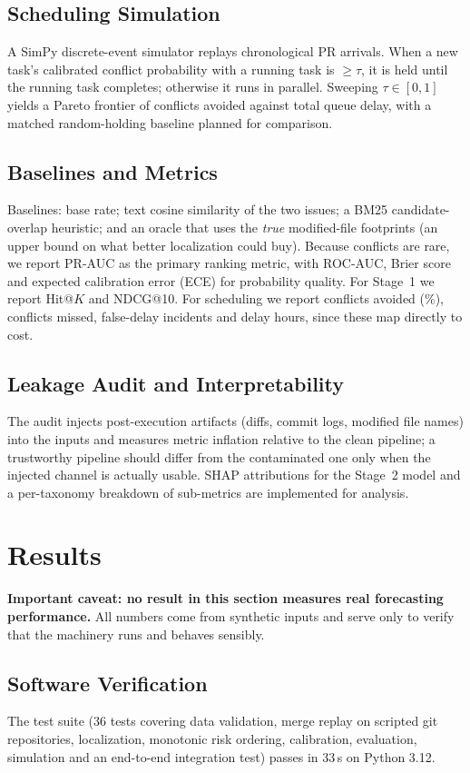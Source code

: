 \documentclass[sigconf, authorversion, nonacm]{acmart}
\begin{document}
\subsection{Scheduling Simulation}
A SimPy discrete-event simulator replays chronological PR arrivals. When a new task's calibrated conflict probability with a running task is $\ge\tau$, it is held until the running task completes; otherwise it runs in parallel. Sweeping $\tau\in[0,1]$ yields a Pareto frontier of conflicts avoided against total queue delay, with a matched random-holding baseline planned for comparison.

\subsection{Baselines and Metrics}
Baselines: base rate; text cosine similarity of the two issues; a BM25 candidate-overlap heuristic; and an oracle that uses the \emph{true} modified-file footprints (an upper bound on what better localization could buy). Because conflicts are rare, we report PR-AUC as the primary ranking metric, with ROC-AUC, Brier score and expected calibration error (ECE) for probability quality. For Stage~1 we report Hit@$K$ and NDCG@10. For scheduling we report conflicts avoided (\%), conflicts missed, false-delay incidents and delay hours, since these map directly to cost.

\subsection{Leakage Audit and Interpretability}
The audit injects post-execution artifacts (diffs, commit logs, modified file names) into the inputs and measures metric inflation relative to the clean pipeline; a trustworthy pipeline should differ from the contaminated one only when the injected channel is actually usable. SHAP attributions for the Stage~2 model and a per-taxonomy breakdown of sub-metrics are implemented for analysis.

\section{Results}
\textbf{Important caveat: no result in this section measures real forecasting performance.} All numbers come from synthetic inputs and serve only to verify that the machinery runs and behaves sensibly.

\subsection{Software Verification}
The test suite (36 tests covering data validation, merge replay on scripted git repositories, localization, monotonic risk ordering, calibration, evaluation, simulation and an end-to-end integration test) passes in 33\,s on Python 3.12.
\end{document}
